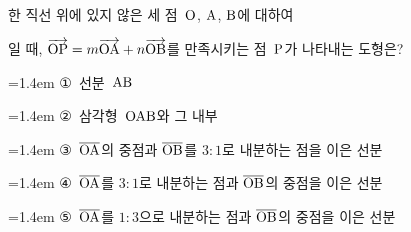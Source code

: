 한 직선 위에 있지 않은 세 점~$\mathrm{O}$, $\mathrm{A}$, $\mathrm{B}$에 대하여\par\smallskip{}\par\smallskip\noindent 일 때, $\overrightarrow{\mathrm{OP}}=m\overrightarrow{\mathrm{OA}}+n\overrightarrow{\mathrm{OB}}$를 만족시키는 점~$\mathrm{P}$가 나타내는 도형은?
\par\medskip\par\noindent\hangindent=1.4em {\small ①}\ 선분~$\mathrm{AB}$\par\noindent\hangindent=1.4em {\small ②}\ 삼각형~$\mathrm{OAB}$와 그 내부\par\noindent\hangindent=1.4em {\small ③}\ $\overline{\mathrm{OA}}$의 중점과 $\overline{\mathrm{OB}}$를 $3:1$로 내분하는 점을 이은 선분\par\noindent\hangindent=1.4em {\small ④}\ $\overline{\mathrm{OA}}$를 $3:1$로 내분하는 점과 $\overline{\mathrm{OB}}$의 중점을 이은 선분\par\noindent\hangindent=1.4em {\small ⑤}\ $\overline{\mathrm{OA}}$를 $1:3$으로 내분하는 점과 $\overline{\mathrm{OB}}$의 중점을 이은 선분\par\medskip
